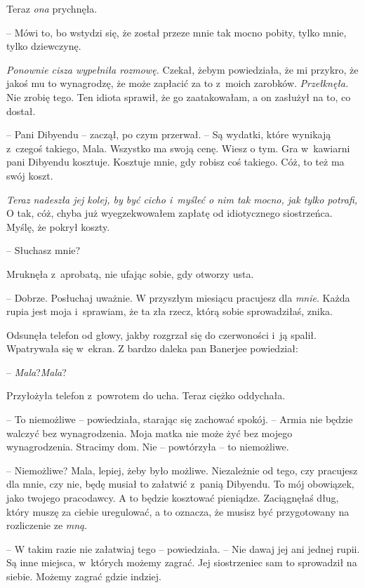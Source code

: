 \documentclass[oneside,polish,11pt,rmheadings]{mwbk}
\begin{document}
Teraz \textit{ona }prychnęła.

-- Mówi to, bo wstydzi się, że został przeze mnie tak mocno pobity, tylko mnie, tylko dziewczynę. 


\textit{Ponownie cisza wypełniła rozmowę. }Czekał, żebym powiedziała, że mi przykro, że jakoś mu to wynagrodzę, że może zapłacić za to z~moich zarobków. \textit{Przełknęła. }Nie zrobię tego. Ten idiota sprawił, że go zaatakowałam, a on zasłużył na to, co dostał.


-- Pani Dibyendu -- zaczął, po czym przerwał. -- Są wydatki, które wynikają z~czegoś takiego, Mala. Wszystko ma swoją cenę. Wiesz o tym. Gra w~kawiarni pani Dibyendu kosztuje. Kosztuje mnie, gdy robisz coś takiego. Cóż, to też ma swój koszt. 


\textit{Teraz nadeszła jej kolej, by być cicho i~myśleć o nim tak mocno, jak tylko potrafi,} O tak, cóż, chyba już wyegzekwowałem zapłatę od idiotycznego siostrzeńca. Myślę, że pokrył koszty.


-- Słuchasz mnie?  


Mruknęła z~aprobatą, nie ufając sobie, gdy otworzy usta. 


-- Dobrze. Posłuchaj uważnie. W przyszłym miesiącu pracujesz dla \textit{mnie}. Każda rupia jest moja i~sprawiam, że ta zła rzecz, którą sobie sprowadziłaś, znika.  


Odsunęła telefon od głowy, jakby rozgrzał się do czerwoności i~ją spalił. Wpatrywała się w~ekran. Z bardzo daleka pan Banerjee powiedział: 

-- \textit{Mala}?\textit{Mala}? 

Przyłożyła telefon z~powrotem do ucha. Teraz ciężko oddychała. 

-- To niemożliwe -- powiedziała, starając się zachować spokój. -- Armia nie będzie walczyć bez wynagrodzenia. Moja matka nie może żyć bez mojego wynagrodzenia. Stracimy dom. Nie -- powtórzyła -- to niemożliwe. 


-- Niemożliwe? Mala, lepiej, żeby było możliwe. Niezależnie od tego, czy pracujesz dla mnie, czy nie, będę musiał to załatwić z~panią Dibyendu. To mój obowiązek, jako twojego pracodawcy. A to będzie kosztować pieniądze. Zaciągnęłaś dług, który muszę za ciebie uregulować, a to oznacza, że musisz być przygotowany na rozliczenie ze \textit{mną}. 


-- W takim razie nie załatwiaj tego -- powiedziała. -- Nie dawaj jej ani jednej rupii. Są inne miejsca, w~których możemy zagrać. Jej siostrzeniec sam to sprowadził na siebie. Możemy zagrać gdzie indziej. 
\end{document}
